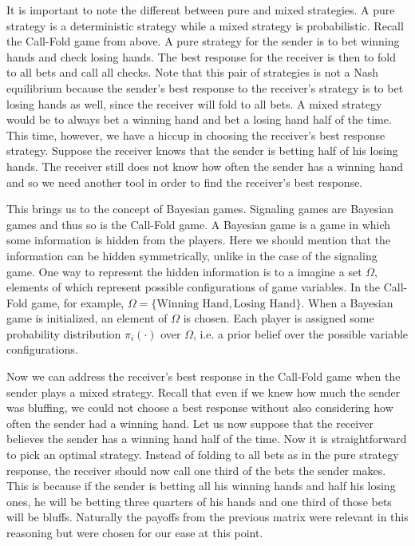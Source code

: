 \documentclass{article}
\begin{document}
It is important to note the different between pure and mixed strategies. A pure strategy is a deterministic strategy while a mixed strategy is probabilistic. Recall the Call-Fold game from above. A pure strategy for the sender is to bet winning hands and check losing hands. The best response for the receiver is then to fold to all bets and call all checks. Note that this pair of strategies is not a Nash equilibrium because the sender's best response to the receiver's strategy is to bet losing hands as well, since the receiver will fold to all bets. A mixed strategy would be to always bet a winning hand and bet a losing hand half of the time. This time, however, we have a hiccup in choosing the receiver's best response strategy. Suppose the receiver knows that the sender is betting half of his losing hands. The receiver still does not know how often the sender has a winning hand and so we need another tool in order to find the receiver's best response.

This brings us to the concept of Bayesian games. Signaling games are Bayesian games and thus so is the Call-Fold game. A Bayesian game is a game in which some information is hidden from the players. Here we should mention that the information can be hidden symmetrically, unlike in the case of the signaling game. One way to represent the hidden information is to a imagine a set $\Omega$, elements of which represent possible configurations of game variables. In the Call-Fold game, for example, $\Omega = \{\text{Winning Hand}, \text{Losing Hand}\}$. When a Bayesian game is initialized, an element of $\Omega$ is chosen. Each player is assigned some probability distribution $\pi_{i}(\cdot)$ over $\Omega$, i.e. a prior belief over the possible variable configurations.

Now we can address the receiver's best response in the Call-Fold game when the sender plays a mixed strategy. Recall that even if we knew how much the sender was bluffing, we could not choose a best response without also considering how often the sender had a winning hand. Let us now suppose that the receiver believes the sender has a winning hand half of the time. Now it is straightforward to pick an optimal strategy. Instead of folding to all bets as in the pure strategy response, the receiver should now call one third of the bets the sender makes. This is because if the sender is betting all his winning hands and half his losing ones, he will be betting three quarters of his hands and one third of those bets will be bluffs. Naturally the payoffs from the previous matrix were relevant in this reasoning but were chosen for our ease at this point.
\end{document}
